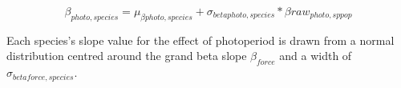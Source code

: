 \documentclass[11pt,letter]{article}
\begin{document}
\begin{equation}
\beta_{photo,species}  = \mu_{\beta photo, species} + \sigma_{beta photo, species} * \beta raw_{photo, sppop}
\end{equation}

Each species's slope value for the effect of photoperiod is drawn from a normal distribution centred around the grand beta slope $\beta_{force}$ and a width of $\sigma_{beta force, species}$.







\end{document}
